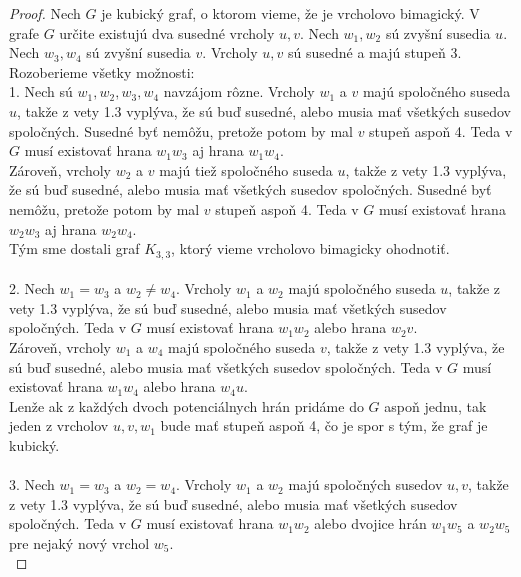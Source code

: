 \begin{proof} Nech $G$ je kubický graf, o ktorom vieme, že je vrcholovo bimagický. V grafe $G$ určite existujú dva susedné vrcholy $u,v$. Nech $w_1, w_2$ sú zvyšní susedia $u$. Nech $w_3, w_4$ sú zvyšní susedia $v$. Vrcholy $u,v$ sú susedné a majú stupeň 3. Rozoberieme všetky možnosti: \\

1. Nech sú $w_1, w_2, w_3, w_4$ navzájom rôzne. Vrcholy $w_1$ a $v$ majú spoločného suseda $u$, takže z vety 1.3 vyplýva, že sú buď susedné, alebo musia mať všetkých susedov spoločných. Susedné byť nemôžu, pretože potom by mal $v$ stupeň aspoň 4. Teda v $G$ musí existovať hrana $w_1 w_3$ aj hrana $w_1 w_4$. \\

Zároveň, vrcholy $w_2$ a $v$ majú tiež spoločného suseda $u$, takže z vety 1.3 vyplýva, že sú buď susedné, alebo musia mať všetkých susedov spoločných. Susedné byť nemôžu, pretože potom by mal $v$ stupeň aspoň 4. Teda v $G$ musí existovať hrana $w_2 w_3$ aj hrana $w_2 w_4$. \\

Tým sme dostali graf $K_{3,3}$, ktorý vieme vrcholovo bimagicky ohodnotiť. \\\\

2. Nech $w_1 = w_3$ a $w_2 \neq w_4$. Vrcholy $w_1$ a $w_2$ majú spoločného suseda $u$, takže z vety 1.3 vyplýva, že sú buď susedné, alebo musia mať všetkých susedov spoločných. Teda v $G$ musí existovať hrana $w_1 w_2$ alebo hrana $w_2 v$. \\

Zároveň, vrcholy $w_1$ a $w_4$ majú spoločného suseda $v$, takže z vety 1.3 vyplýva, že sú buď susedné, alebo musia mať všetkých susedov spoločných. Teda v $G$ musí existovať hrana $w_1 w_4$ alebo hrana $w_4 u$. \\

Lenže ak z každých dvoch potenciálnych hrán pridáme do $G$ aspoň jednu, tak jeden z vrcholov $u, v, w_1$ bude mať stupeň aspoň 4, čo je spor s tým, že graf je kubický. \\\\

3. Nech $w_1 = w_3$ a $w_2 = w_4$. Vrcholy $w_1$ a $w_2$ majú spoločných susedov $u,v$, takže z vety 1.3 vyplýva, že sú buď susedné, alebo musia mať všetkých susedov spoločných. Teda v $G$ musí existovať hrana $w_1 w_2$ alebo dvojice hrán $w_1 w_5$ a $w_2 w_5$ pre nejaký nový vrchol $w_5$. \\


\end{proof}
